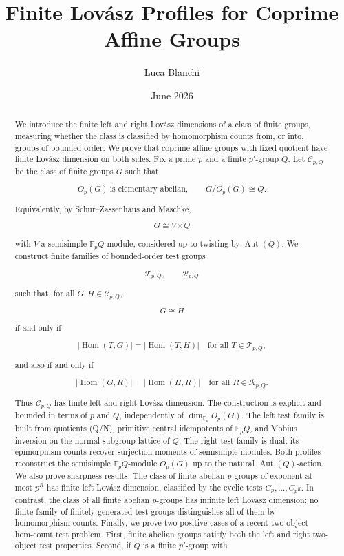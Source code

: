\documentclass[11pt]{article}
\title{Finite Lovász Profiles for Coprime Affine Groups}
\author{Luca Blanchi}
\date{June 2026}
\begin{document}
\maketitle

\begin{abstract}
We introduce the finite left and right Lovász dimensions of a class of finite groups, measuring whether the class is classified by homomorphism counts from, or into, groups of bounded order. We prove that coprime affine groups with fixed quotient have finite Lovász dimension on both sides. Fix a prime $p$ and a finite $p'$-group $Q$. Let $\mathcal C_{p,Q}$ be the class of finite groups $G$ such that

\[
O_p(G)\ \text{is elementary abelian},\qquad G/O_p(G)\cong Q.
\]

Equivalently, by Schur--Zassenhaus and Maschke,

\[
G\cong V\rtimes Q
\]

with $V$ a semisimple $\mathbb F_pQ$-module, considered up to twisting by $\operatorname{Aut}(Q)$. We construct finite families of bounded-order test groups

\[
\mathcal T_{p,Q},\qquad \mathcal R_{p,Q}
\]

such that, for all $G,H\in\mathcal C_{p,Q}$,

\[
G\cong H
\]

if and only if

\[
|\operatorname{Hom}(T,G)|=|\operatorname{Hom}(T,H)|
\quad\text{for all }T\in\mathcal T_{p,Q},
\]

and also if and only if

\[
|\operatorname{Hom}(G,R)|=|\operatorname{Hom}(H,R)|
\quad\text{for all }R\in\mathcal R_{p,Q}.
\]

Thus $\mathcal C_{p,Q}$ has finite left and right Lovász dimension. The construction is explicit and bounded in terms of $p$ and $Q$, independently of $\dim_{\mathbb F_p}O_p(G)$. The left test family is built from quotients (Q/N), primitive central idempotents of $\mathbb F_pQ$, and Möbius inversion on the normal subgroup lattice of $Q$. The right test family is dual: its epimorphism counts recover surjection moments of semisimple modules. Both profiles reconstruct the semisimple $\mathbb F_pQ$-module $O_p(G)$ up to the natural $\operatorname{Aut}(Q)$-action. We also prove sharpness results. The class of finite abelian $p$-groups of exponent at most $p^R$ has finite left Lovász dimension, classified by the cyclic tests $C_p,\ldots,C_{p^R}$. In contrast, the class of all finite abelian $p$-groups has infinite left Lovász dimension: no finite family of finitely generated test groups distinguishes all of them by homomorphism counts. Finally, we prove two positive cases of a recent two-object hom-count test problem. First, finite abelian groups satisfy both the left and right two-object test properties. Second, if $Q$ is a finite $p'$-group with


\end{abstract}
\end{document}
